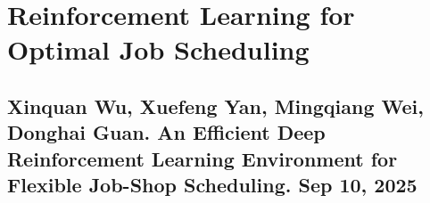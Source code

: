 \documentclass{article}
\begin{document}

\section{Reinforcement Learning for Optimal Job Scheduling}


\subsection{{\sc Xinquan Wu, Xuefeng Yan, Mingqiang Wei, Donghai Guan}. An Efficient Deep Reinforcement Learning Environment for Flexible Job-Shop Scheduling. Sep 10, 2025}
\end{document}
